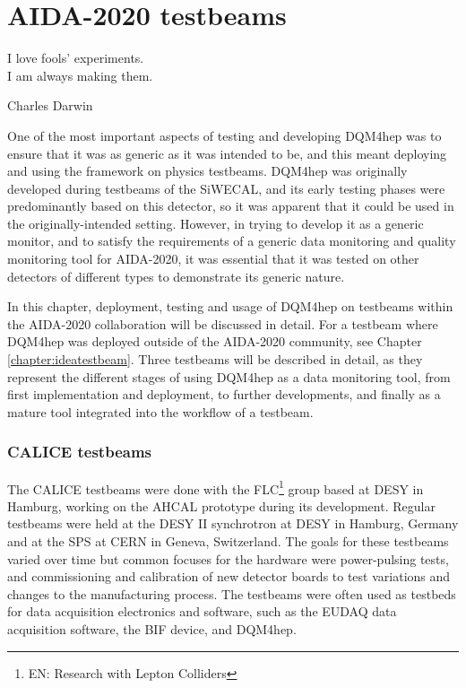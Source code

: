 \chapter{AIDA-2020 testbeams}
\label{chapter:aidatestbeams}
 
\epigraph{I love fools' experiments. \\I am always making them.}{Charles Darwin}

One of the most important aspects of testing and developing DQM4hep was to ensure that it was as generic as it was intended to be, and this meant deploying and using the framework on physics testbeams. DQM4hep was originally developed during testbeams of the \acrfull{SiWECAL}, and its early testing phases were predominantly based on this detector, so it was apparent that it could be used in the originally-intended setting. However, in trying to develop it as a generic monitor, and to satisfy the requirements of a generic data monitoring and quality monitoring tool for AIDA-2020, it was essential that it was tested on other detectors of different types to demonstrate its generic nature. 

In this chapter, deployment, testing and usage of DQM4hep on testbeams within the AIDA-2020 collaboration will be discussed in detail. For a testbeam where DQM4hep was deployed outside of the AIDA-2020 community, see Chapter \ref{chapter:ideatestbeam}. Three testbeams will be described in detail, as they represent the different stages of using DQM4hep as a data monitoring tool, from first implementation and deployment, to further developments, and finally as a mature tool integrated into the workflow of a testbeam.

\subsection*{CALICE testbeams}
The \acrshort{CALICE} testbeams were done with the \acrfull{FLC}\footnote{EN: Research with Lepton Colliders} group based at DESY in Hamburg, working on the \acrfull{AHCAL} prototype during its development. Regular testbeams were held at the DESY II synchrotron at \acrshort{DESY} in Hamburg, Germany and at the \acrfull{SPS} at CERN in Geneva, Switzerland. The goals for these testbeams varied over time but common focuses for the hardware were power-pulsing tests, and commissioning and calibration of new detector boards to test variations and changes to the manufacturing process. The testbeams were often used as testbeds for data acquisition electronics and software, such as the \acrshort{EUDAQ} data acquisition software, the \acrshort{BIF} device, and DQM4hep.

